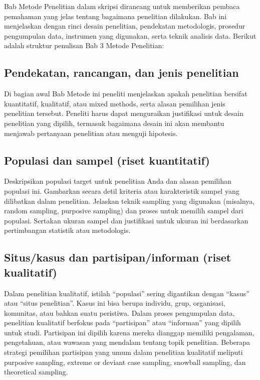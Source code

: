 \documentclass[
  indonesian,
  letterpaper,
]{scrbook}
\begin{document}
Bab Metode Penelitian dalam skripsi dirancang untuk memberikan pembaca
pemahaman yang jelas tentang bagaimana penelitian dilakukan. Bab ini
menjelaskan dengan rinci desain penelitian, pendekatan metodologis,
prosedur pengumpulan data, instrumen yang digunakan, serta teknik
analisis data. Berikut adalah struktur penulisan Bab 3 Metode
Penelitian:

\subsection{Pendekatan, rancangan, dan jenis
penelitian}\label{pendekatan-rancangan-dan-jenis-penelitian}

Di bagian awal Bab Metode ini peneliti menjelaskan apakah penelitian
bersifat kuantitatif, kualitatif, atau mixed methods, serta alasan
pemilihan jenis penelitian tersebut. Peneliti harus dapat menguraikan
justifikasi untuk desain penelitian yang dipilih, termasuk bagaimana
desain ini akan membantu menjawab pertanyaan penelitian atau menguji
hipotesis.

\subsection{Populasi dan sampel (riset
kuantitatif)}\label{populasi-dan-sampel-riset-kuantitatif}

Deskripsikan populasi target untuk penelitian Anda dan alasan pemilihan
populasi ini. Gambarkan secara detil kriteria atau karakteristik sampel
yang dilibatkan dalam penelitian. Jelaskan teknik sampling yang
digunakan (misalnya, random sampling, purposive sampling) dan proses
untuk memilih sampel dari populasi. Sertakan ukuran sampel dan
justifikasi untuk ukuran ini berdasarkan pertimbangan statistik atau
metodologis.

\subsection{Situs/kasus dan partisipan/informan (riset
kualitatif)}\label{situskasus-dan-partisipaninforman-riset-kualitatif}

Dalam penelitian kualitatif, istilah ``populasi'' sering digantikan
dengan ``kasus'' atau ``situs penelitian''. Kasus ini bisa berupa
individu, grup, organisasi, komunitas, atau bahkan suatu peristiwa.
Dalam proses pengumpulan data, penelitian kualitatif berfokus pada
``partisipan'' atau ``informan'' yang dipilih untuk studi. Partisipan
ini dipilih karena mereka dianggap memiliki pengalaman, pengetahuan,
atau wawasan yang mendalam tentang topik penelitian. Beberapa strategi
pemilihan partisipan yang umum dalam penelitian kualitatif meliputi
purposive sampling, extreme or deviant case sampling, snowball sampling,
dan theoretical sampling.
\end{document}
